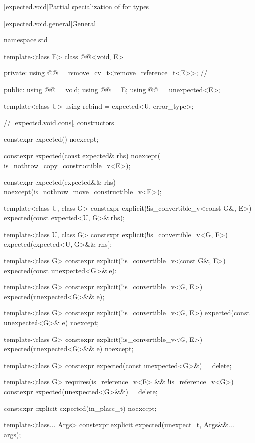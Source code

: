 [expected.void]{Partial specialization of  for  types}

[expected.void.general]{General}

\begin{codeblock}
namespace std {
  template<class E>
  class @@<void, E> {
  private:
    using @@ = remove_cv_t<remove_reference_t<E>>; // \expos

  public:
    using @@ = void;
    using @@ = E;
    using @@ = unexpected<E>;

    template<class U> using rebind = expected<U, error_type>;

    // \ref{expected.void.cons}, constructors

    constexpr expected() noexcept;

    constexpr expected(const expected& rhs) noexcept(
        is_nothrow_copy_constructible_v<E>);

    constexpr expected(expected&& rhs) noexcept(is_nothrow_move_constructible_v<E>);

    template<class U, class G>
    constexpr explicit(!is_convertible_v<const G&, E>)
        expected(const expected<U, G>& rhs);

    template<class U, class G>
    constexpr explicit(!is_convertible_v<G, E>) expected(expected<U, G>&& rhs);

    template<class G>
    constexpr explicit(!is_convertible_v<const G&, E>) expected(const unexpected<G>& e);

    template<class G>
    constexpr explicit(!is_convertible_v<G, E>) expected(unexpected<G>&& e);

    template<class G>
    constexpr explicit(!is_convertible_v<G, E>)
        expected(const unexpected<G>& e) noexcept;

    template<class G>
    constexpr explicit(!is_convertible_v<G, E>) expected(unexpected<G>&& e) noexcept;

    template<class G> constexpr expected(const unexpected<G>&) = delete;

    template<class G>
      requires(is_reference_v<E> && !is_reference_v<G>)
    constexpr expected(unexpected<G>&&) = delete;

    constexpr explicit expected(in_place_t) noexcept;

    template<class... Args> constexpr explicit expected(unexpect_t, Args&&... args);

}}
\end{codeblock}
